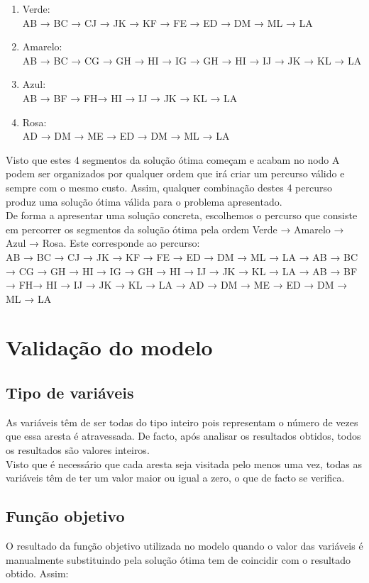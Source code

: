 \documentclass[a4paper]{report}
\begin{document}
\begin{enumerate}
    \item Verde: \\
    AB → BC → CJ → JK → KF → FE → ED → DM → ML → LA
    \item Amarelo: \\
    AB → BC → CG → GH → HI  → IG → GH → HI → IJ → JK  → KL  → LA
    \item Azul: \\
    AB → BF → FH→ HI  → IJ → JK  → KL  → LA
    \item Rosa: \\
    AD → DM → ME → ED  → DM → ML → LA
\end{enumerate}
Visto que estes 4 segmentos da solução ótima começam e acabam no nodo A podem
ser organizados por qualquer ordem que irá criar um percurso válido e sempre com
o mesmo custo. Assim, qualquer combinação destes 4 percurso produz uma solução
ótima válida para o problema apresentado.\\
De forma a apresentar uma solução concreta, escolhemos o percurso que consiste
em percorrer os segmentos da solução ótima pela ordem Verde → Amarelo → Azul →
Rosa. Este corresponde ao percurso:\\
AB → BC → CJ → JK → KF → FE → ED → DM → ML → LA →
AB → BC → CG → GH → HI  → IG → GH → HI → IJ → JK  → KL  → LA →
AB → BF → FH→ HI  → IJ → JK  → KL  → LA →
AD → DM → ME → ED  → DM → ML → LA

\pagebreak
\section{Validação do modelo}
\subsection{Tipo de variáveis}
As variáveis têm de ser todas do tipo inteiro pois representam o número
de vezes que essa aresta é atravessada. De facto, após analisar os resultados
obtidos, todos os resultados são valores inteiros.\\
Visto que é necessário que cada aresta seja visitada pelo menos uma
vez, todas as variáveis têm de ter um valor maior ou igual a zero, o
que de facto se verifica.

\subsection{Função objetivo}
O resultado da função objetivo utilizada no modelo quando o valor
das variáveis é manualmente substituindo pela solução ótima tem de 
coincidir com o resultado obtido.
Assim:
\end{document}
